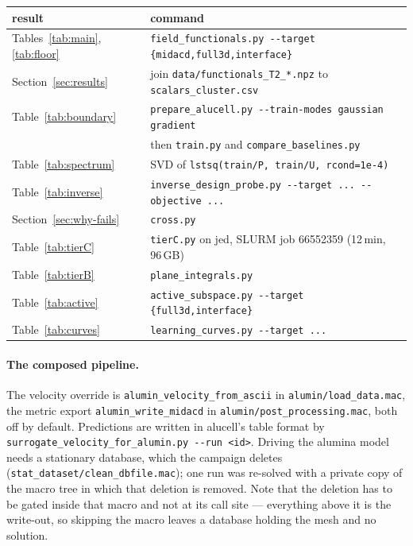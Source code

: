 \documentclass[11pt,a4paper]{article}
\theoremstyle{plain}
\theoremstyle{definition}
\theoremstyle{remark}
\begin{document}
\begin{center}
\small
\begin{tabular}{@{}ll@{}}
\toprule
result & command \\
\midrule
Tables~\ref{tab:main}, \ref{tab:floor} & \verb|field_functionals.py --target {midacd,full3d,interface}| \\
Section~\ref{sec:results} & join \verb|data/functionals_T2_*.npz| to \verb|scalars_cluster.csv| \\
Table~\ref{tab:boundary} & \verb|prepare_alucell.py --train-modes gaussian gradient| \\
                         & then \verb|train.py| and \verb|compare_baselines.py| \\
Table~\ref{tab:spectrum} & SVD of \verb|lstsq(train/P, train/U, rcond=1e-4)| \\
Table~\ref{tab:inverse}  & \verb|inverse_design_probe.py --target ... --objective ...| \\
Section~\ref{sec:why-fails} & \verb|cross.py| \\
Table~\ref{tab:tierC} & \verb|tierC.py| on jed, SLURM job 66552359 (12\,min, 96\,GB) \\
Table~\ref{tab:tierB} & \verb|plane_integrals.py| \\
Table~\ref{tab:active} & \verb|active_subspace.py --target {full3d,interface}| \\
Table~\ref{tab:curves} & \verb|learning_curves.py --target ...| \\
\bottomrule
\end{tabular}
\end{center}

\paragraph{The composed pipeline.} The velocity override is
\verb|alumin_velocity_from_ascii| in \verb|alumin/load_data.mac|, the metric
export \verb|alumin_write_midacd| in \verb|alumin/post_processing.mac|, both off
by default. Predictions are written in alucell's table format by
\verb|surrogate_velocity_for_alumin.py --run <id>|. Driving the alumina model
needs a stationary database, which the campaign deletes
(\verb|stat_dataset/clean_dbfile.mac|); one run was re-solved with a private copy
of the macro tree in which that deletion is removed. Note that the deletion has
to be gated inside that macro and not at its call site --- everything above it is
the write-out, so skipping the macro leaves a database holding the mesh and no
solution.
\end{document}
